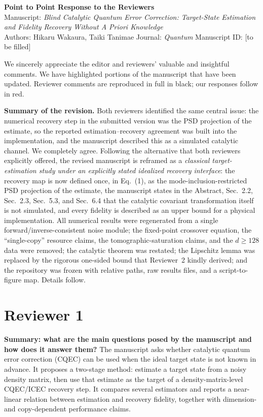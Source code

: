 \documentclass[11pt,a4paper]{article}
\newcommand{\rev}[1]{{\color{black}#1}}
\newcommand{\resp}[1]{{\color{red}#1}}
\begin{document}
\begin{center}
{\Large\textbf{Point to Point Response to the Reviewers}}\\[0.3em]
Manuscript: \emph{Blind Catalytic Quantum Error Correction: Target-State Estimation and Fidelity Recovery Without A Priori Knowledge}\\
Authors: Hikaru Wakaura, Taiki Tanimae \quad Journal: \emph{Quantum} \quad Manuscript ID: [to be filled]
\end{center}

\resp{We sincerely appreciate the editor and reviewers' valuable and insightful comments. We have highlighted portions of the manuscript that have been updated. Reviewer comments are reproduced in full in black; our responses follow in red.}

\resp{\textbf{Summary of the revision.} Both reviewers identified the same central issue: the numerical recovery step in the submitted version was the PSD projection of the estimate, so the reported estimation--recovery agreement was built into the implementation, and the manuscript described this as a simulated catalytic channel. We completely agree. Following the alternative that both reviewers explicitly offered, the revised manuscript is reframed as a \emph{classical target-estimation study under an explicitly stated idealized recovery interface}: the recovery map is now defined once, in Eq.~(1), as the mode-inclusion-restricted PSD projection of the estimate, the manuscript states in the Abstract, Sec.~2.2, Sec.~2.3, Sec.~5.3, and Sec.~6.4 that the catalytic covariant transformation itself is not simulated, and every fidelity is described as an upper bound for a physical implementation. All numerical results were regenerated from a single forward/inverse-consistent noise module; the fixed-point crossover equation, the ``single-copy'' resource claims, the tomographic-saturation claims, and the $d \geq 128$ data were removed; the catalytic theorem was restated; the Lipschitz lemma was replaced by the rigorous one-sided bound that Reviewer~2 kindly derived; and the repository was frozen with relative paths, raw results files, and a script-to-figure map. Details follow.}

\section*{Reviewer 1}

\rev{\textbf{Summary: what are the main questions posed by the manuscript and how does it answer them?} The manuscript asks whether catalytic quantum error correction (CQEC) can be used when the ideal target state is not known in advance. It proposes a two-stage method: estimate a target state from a noisy density matrix, then use that estimate as the target of a density-matrix-level CQEC/ICEC recovery step. It compares several estimators and reports a near-linear relation between estimation and recovery fidelity, together with dimension- and copy-dependent performance claims.}
\end{document}

